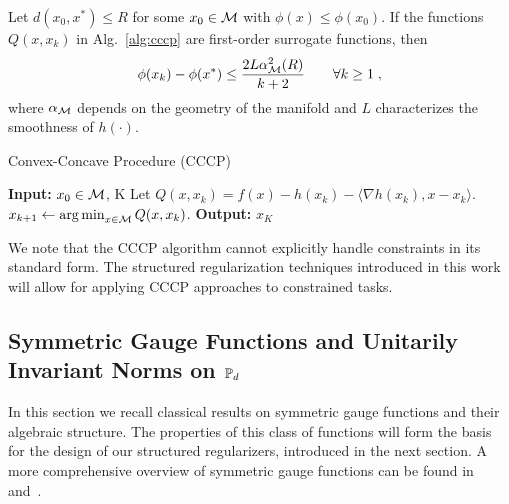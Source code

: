 \documentclass[sn-nature]{sn-jnl}%
\theoremstyle{thmstyleone}%
\theoremstyle{thmstyletwo}%
\theoremstyle{thmstylethree}%
\begin{document}
\begin{theorem}
\label{prop:cccp-conv}
Let $d(x_0,x^*) \leq R$ for some $x_0 \in \mathcal{M}$ with $\phi(x) \leq \phi(x_0)$. If the functions $Q(x,x_k)$ in Alg.~\ref{alg:cccp} are first-order surrogate functions, then
\begin{equation}
    \phi(x_k) - \phi(x^*) \leq \frac{2L\alpha_{\mathcal{M}}^2(R)}{k+2} \qquad \forall k \geq 1 \; ,
\end{equation}
where $\alpha_{\mathcal{M}}$ depends on the geometry of the manifold and $L$ characterizes the smoothness of $h(\cdot)$.
\end{theorem}
%
\begin{algorithm}
\small 
 \caption{Convex-Concave Procedure (CCCP)} 
  \label{alg:cccp}
  \begin{algorithmic}[1]
    \State \textbf{Input:} $x_0 \in \mathcal{M}$, K
        \State Let $Q(x, x_k) = f(x) - h(x_k) - \langle \nabla h(x_k),x-x_k \rangle$.
        \State $x_{k+1} \gets \operatorname*{arg\,min}_{x \in \mathcal{M}} Q(x,x_k)$.
    \EndFor
    \State \textbf{Output:} $x_K$
  \end{algorithmic}
\end{algorithm}
%

We note that the CCCP algorithm cannot explicitly handle constraints in its standard form. The structured regularization techniques introduced in this work will allow for applying CCCP approaches to constrained tasks.





\subsection{Symmetric Gauge Functions and Unitarily Invariant Norms on $\mathbb{P}_d$}
In this section we recall classical results on symmetric gauge functions and their algebraic structure. The properties of this class of functions will form the basis for the design of our structured regularizers, introduced in the next section. A more comprehensive overview of symmetric gauge functions can be found in~\citep{LIM2013115} and~\citep[Ch. IV]{bhatia97}.
\end{document}

